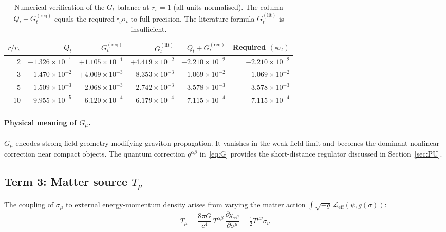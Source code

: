 \documentclass[11pt,a4paper]{article}
\theoremstyle{plain}
\theoremstyle{definition}
\theoremstyle{remark}
\newcommand{\rs}{r_s}
\newcommand{\half}{\tfrac{1}{2}}
\begin{document}
\begin{table}[h]
\centering
\renewcommand{\arraystretch}{1.3}
\begin{tabular}{rrrrrr}
\toprule
$r/\rs$ & $Q_t$ & $G_t^{(\mathrm{req})}$ & $G_t^{(\mathrm{lit})}$ &
  $Q_t+G_t^{(\mathrm{req})}$ & Required $(\square\sigma_t)$ \\
\midrule
2  & $-1.326\times10^{-1}$ & $+1.105\times10^{-1}$ & $+4.419\times10^{-2}$ &
  $-2.210\times10^{-2}$ & $-2.210\times10^{-2}$ \\
3  & $-1.470\times10^{-2}$ & $+4.009\times10^{-3}$ & $-8.353\times10^{-3}$ &
  $-1.069\times10^{-2}$ & $-1.069\times10^{-2}$ \\
5  & $-1.509\times10^{-3}$ & $-2.068\times10^{-3}$ & $-2.742\times10^{-3}$ &
  $-3.578\times10^{-3}$ & $-3.578\times10^{-3}$ \\
10 & $-9.955\times10^{-5}$ & $-6.120\times10^{-4}$ & $-6.179\times10^{-4}$ &
  $-7.115\times10^{-4}$ & $-7.115\times10^{-4}$ \\
\bottomrule
\end{tabular}
\caption{Numerical verification of the $G_t$ balance at $\rs=1$ (all units normalised).
The column $Q_t + G_t^{(\mathrm{req})}$ equals the required $\square_g\sigma_t$ to
full precision. The literature formula $G_t^{(\mathrm{lit})}$ is insufficient.}
\label{tab:Gt}
\end{table}

\paragraph{Physical meaning of $G_\mu$.}
$G_\mu$ encodes strong-field geometry modifying graviton propagation.  It vanishes
in the weak-field limit and becomes the dominant nonlinear correction near compact
objects.  The quantum correction $q^{\alpha\beta}$ in~\eqref{eq:G} provides
the short-distance regulator discussed in Section~\ref{sec:PU}.

\subsection{Term 3: Matter source $T_\mu$}
\label{sec:Tmu}

The coupling of $\sigma_\mu$ to external energy-momentum density arises from varying
the matter action $\int\sqrt{-g}\,\mathcal{L}_{\mathrm{eff}}(\psi,g(\sigma))$:
\begin{equation}
  \boxed{T_\mu = \frac{8\pi G}{c^4}\,T^{\alpha\beta}\,\frac{\partial g_{\alpha\beta}}{\partial\sigma^\mu}
    = \half T^{\mu\nu}\sigma_\nu}
  \label{eq:T}
\end{equation}
\end{document}
